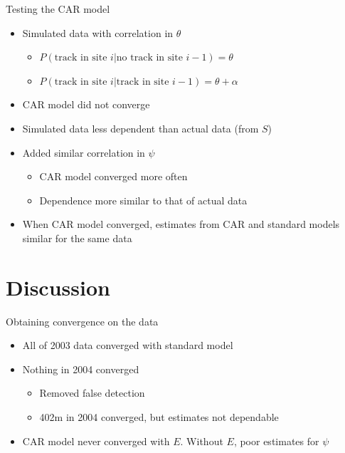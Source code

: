 \documentclass{beamer}
\begin{document}

\begin{frame}{Testing the CAR model}
	\begin{itemize}
		\item Simulated data with correlation in $\theta$
		\begin{itemize}
			\item $P(\text{track in site }i|\text{no track in site }i-1)=\theta$
			\item $P(\text{track in site }i|\text{track in site }i-1)=\theta+
			\alpha$
		\end{itemize}
		\item CAR model did not converge
		\item Simulated data less dependent than actual data (from $S$)
		\item Added similar correlation in $\psi$
		\begin{itemize}
			\item CAR model converged more often
			\item Dependence more similar to that of actual data
		\end{itemize}
		\item When CAR model converged, estimates from CAR and standard models
		similar for the same data
	\end{itemize}
\end{frame}

\section{Discussion}
\begin{frame}{Obtaining convergence on the data}
	\begin{itemize}
		\item All of 2003 data converged with standard model
		\item Nothing in 2004 converged
		\begin{itemize}
			\item Removed false detection
			\item 402m in 2004 converged, but estimates not dependable
		\end{itemize}
		\item CAR model never converged with $E$. Without $E$, poor
		estimates for $\psi$
	\end{itemize}
\end{frame}
\end{document}
